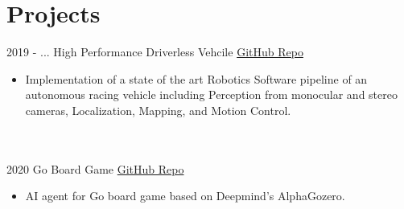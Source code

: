 \documentclass[letterpaper]{twentysecondcv} %
\begin{document}
\section{Projects }{\faClipboard}
\begin{twenty}
	    \twentyitem
   		{2019 - ...}
		{}
        {High Performance Driverless Vehcile}
        {\href{https://github.com/curtfs/CURT-FSAI/}{GitHub Repo}}
        {}
        {\vspace{-2mm}\begin{itemize}[topsep=0pt,partopsep=0pt]
				\item  Implementation of a state of the art Robotics Software pipeline of an autonomous racing vehicle including Perception from monocular and stereo cameras, Localization, Mapping, and Motion Control.
       
    \end{itemize}} \\\\
			
	    \twentyitem
   		{2020}
		{}
        {Go Board Game}
        {\href{https://github.com/JoGo20/Implementation/}{GitHub Repo}}
        {}
        {\vspace{-2mm}\begin{itemize}[topsep=0pt,partopsep=0pt]
				\item  AI agent for Go board game based on Deepmind's AlphaGozero.
       
    \end{itemize}} \\\\
		

	
		
	
\end{twenty}
\end{document}
